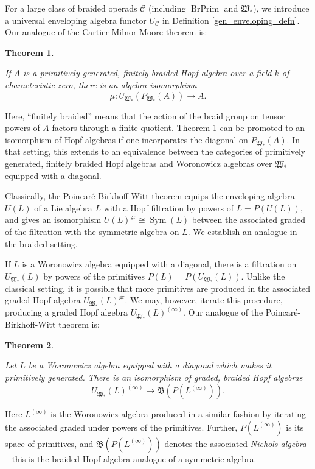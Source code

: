 \documentclass[12pt]{article}
\DeclareMathOperator{\Sym}{Sym}
\DeclareMathOperator{\BrPrim}{BrPrim}
\DeclareMathOperator{\gr}{gr}
\newcommand{\CC} {\mathcal{C}}
\newcommand{\mB}{\mathfrak{B}}
\newcommand{\mW}{\mathfrak{W}}
\theoremstyle{plain}
\newtheorem{intro}{Theorem}
\theoremstyle{definition}
\theoremstyle{remark}
\begin{document}
For a large class of braided operads $\CC$ (including $\BrPrim$ and $\mW_*$), we introduce a universal enveloping algebra functor $U_{\CC}$ in Definition \ref{gen_enveloping_defn}.  Our analogue of the Cartier-Milnor-Moore theorem is: 

\begin{intro} \label{mm_intro}

If $A$ is a primitively generated, finitely braided Hopf algebra over a field $k$ of characteristic zero, there is an algebra isomorphism
%
$$\mu: U_{\mW_*}(P_{\mW_*}(A)) \to A.$$ 

\end{intro}

Here, ``finitely braided'' means that the action of the braid group on tensor powers of $A$ factors through a finite quotient.  Theorem \ref{mm_intro} can be promoted to an isomorphism of Hopf algebras if one incorporates the diagonal on $P_{\mW_*}(A)$.  In that setting, this extends to an equivalence between the categories of primitively generated, finitely braided Hopf algebras and Woronowicz algebras over $\mW_*$ equipped with a diagonal.

Classically, the Poincar\'{e}-Birkhoff-Witt theorem equips the enveloping algebra $U(L)$ of a Lie algebra $L$ with a Hopf filtration by powers of $L = P(U(L))$, and gives an isomorphism $U(L)^{\gr} \cong \Sym(L)$ between the associated graded of the filtration with the symmetric algebra on $L$.  We establish an analogue in the braided setting.

If $L$ is a Woronowicz algebra equipped with a diagonal, there is a filtration on $U_{\mW_*}(L)$ by powers of the primitives $P(L) = P(U_{\mW_*}(L))$.  Unlike the classical setting, it is possible that more primitives are produced in the associated graded Hopf algebra $U_{\mW_*}(L)^{\gr}$.  We may, however, iterate this procedure, producing a graded Hopf algebra $U_{\mW_*}(L)^{(\infty)}$.  Our analogue of the Poincar\'{e}-Birkhoff-Witt theorem is:

\begin{intro} \label{pbw_intro}

Let $L$ be a Woronowicz algebra equipped with a diagonal which makes it primitively generated.  There is an isomorphism of graded, braided Hopf algebras
%
$$U_{\mW_*}(L)^{(\infty)} \to \mB(P(L^{(\infty)})).$$

\end{intro}

Here $L^{(\infty)}$ is the Woronowicz algebra produced in a similar fashion by iterating the associated graded under powers of the primitives.  Further, $P(L^{(\infty)})$ is its space of primitives, and $\mB(P(L^{(\infty)}))$ denotes the associated \emph{Nichols algebra} -- this is the braided Hopf algebra analogue of a symmetric algebra. 
\end{document}
